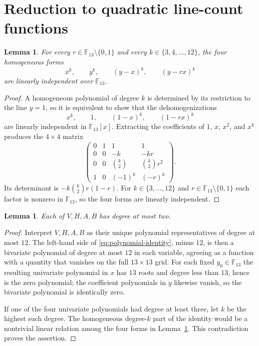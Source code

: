 \documentclass[11pt]{amsart}
\newtheorem{lemma}[theorem]{Lemma}
\theoremstyle{remark}
\newcommand{\F}{\mathbb F}
\begin{document}
\section{Reduction to quadratic line-count functions}\label{sec:degree}

\begin{lemma}\label{lem:rank}
For every $r\in\F_{13}\setminus\{0,1\}$ and every
$k\in\{3,4,\ldots,12\}$, the four homogeneous forms
\[
  x^k,\qquad y^k,\qquad (y-x)^k,\qquad (y-rx)^k
\]
are linearly independent over $\F_{13}$.
\end{lemma}

\begin{proof}
A homogeneous polynomial of degree $k$ is determined by its restriction to
the line $y=1$, so it is equivalent to show that the dehomogenizations
\[
  x^k,\qquad 1,\qquad (1-x)^k,\qquad (1-rx)^k
\]
are linearly independent in $\F_{13}[x]$.  Extracting the coefficients of
$1$, $x$, $x^{2}$, and $x^{k}$ produces the $4\times4$ matrix
\[
\begin{pmatrix}
0 & 1 & 1 & 1 \\
0 & 0 & -k & -kr \\
0 & 0 & \binom{k}{2} & \binom{k}{2}r^{2} \\
1 & 0 & (-1)^{k} & (-r)^{k}
\end{pmatrix}.
\]
Its determinant is $-k\binom{k}{2}r(1-r)$.  For
$k\in\{3,\ldots,12\}$ and $r\in\F_{13}\setminus\{0,1\}$ each factor is
nonzero in $\F_{13}$, so the four forms are linearly independent.
\end{proof}

\begin{lemma}\label{lem:degree-two}
Each of $V,H,A,B$ has degree at most two.
\end{lemma}

\begin{proof}
Interpret $V,H,A,B$ as their unique polynomial representatives of degree at
most $12$.  The left-hand side of \eqref{eq:polynomial-identity}, minus
$12$, is then a bivariate polynomial of degree at most $12$ in each
variable, agreeing as a function with a quantity that vanishes on the full
$13\times13$ grid.  For each fixed $y_{0}\in\F_{13}$ the resulting univariate
polynomial in $x$ has $13$ roots and degree less than $13$, hence is the
zero polynomial; the coefficient polynomials in $y$ likewise vanish, so the
bivariate polynomial is identically zero.

If one of the four univariate polynomials had degree at least three, let $k$
be the highest such degree.  The homogeneous degree-$k$ part of the identity
would be a nontrivial linear relation among the four forms in
Lemma~\ref{lem:rank}.  This contradiction proves the assertion.
\end{proof}
\end{document}

